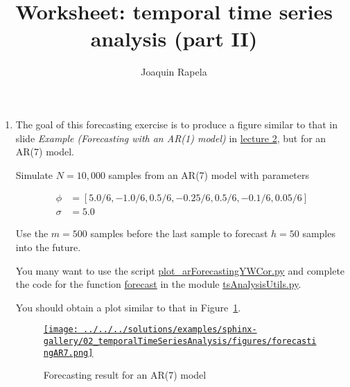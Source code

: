 \documentclass[12pt]{article}
\title{Worksheet: temporal time series analysis (part II)}
\author{Joaquin Rapela}
\begin{document}
\maketitle

\begin{enumerate}

    \item The goal of this forecasting exercise is to produce a figure similar
        to that in slide \emph{Example (Forecasting with an AR(1) model)} in
        \href{https://github.com/joacorapela/statNeuro2025/blob/master/lectures/02_temporalTimeSeriesAnalysis/temporalTimeSeriesAnalysis.pdf}{lecture 2}, but for an AR(7) model.

        Simulate $N=10,000$ samples from an AR(7) model with parameters

        \begin{align*}
            \phi&=[5.0/6,-1.0/6,0.5/6,-0.25/6,0.5/6,-0.1/6,0.05/6]\\
            \sigma&=5.0
        \end{align*}


        \noindent Use the $m=500$ samples before the last sample to forecast $h=50$ samples into
        the future.

        You many want to use the script
        \href{https://github.com/joacorapela/statNeuro2025/blob/master/worksheets/02\_temporalTimeSeriesAnalysis/plot\_arForecastingYWCor.py}{plot\_arForecastingYWCor.py}
        and complete the code for the function
        \href{https://github.com/joacorapela/statNeuro2025/blob/6cfd79b15e698f4522eec97017f5471a4ff67633/worksheets/02\_temporalTimeSeriesAnalysis/tsAnalysisUtils.py\#L53}{forecast}
        in the module
        \href{https://github.com/joacorapela/statNeuro2025/blob/master/worksheets/02\_temporalTimeSeriesAnalysis/tsAnalysisUtils.py}{tsAnalysisUtils.py}.

        You should obtain a plot similar to that in
        Figure~\ref{fig:forecasting}.

        \begin{figure}
            \begin{center}
                \href{}{\texttt{[image: ../../../solutions/examples/sphinx-gallery/02\_temporalTimeSeriesAnalysis/figures/forecastingAR7.png]}}
            \end{center}
            \caption{Forecasting result for an AR(7) model}
            \label{fig:forecasting}
        \end{figure}


\end{enumerate}
\end{document}
